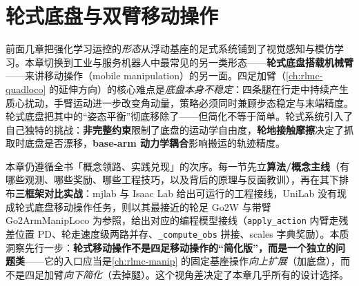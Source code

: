 \chapter{轮式底盘与双臂移动操作}\label{ch:rlmc-wheeled}


前面几章把强化学习运控的\emph{形态}从浮动基座的足式系统铺到了视觉感知与模仿学习。本章切换到工业与服务机器人中最常见的另一类形态——\textbf{轮式底盘搭载机械臂}——来讲移动操作（mobile manipulation）的另一面。四足加臂（\cref{ch:rlmc-quadloco} 的延伸方向）的核心难点是\emph{底盘本身不稳定}：四条腿在行走中持续产生质心扰动，手臂运动进一步改变角动量，策略必须同时兼顾步态稳定与末端精度。轮式底盘把其中的“姿态平衡”彻底移除了——但简化不等于简单。轮式系统引入了自己独特的挑战：\textbf{非完整约束}限制了底盘的运动学自由度，\textbf{轮地接触摩擦}决定了抓取时底盘是否漂移，\textbf{base-arm 动力学耦合}影响搬运的轨迹精度。

本章仍遵循全书「概念领路、实践兑现」的次序。每一节先立\textbf{算法/概念主线}（有哪些观测、哪些奖励、哪些工程技巧，以及背后的原理与反面教训），再在其下排布\textbf{三框架对比实战}：mjlab 与 Isaac Lab 给出可运行的工程接线，UniLab 没有现成轮式底盘移动操作任务，则以其最接近的轮足 Go2W 与带臂 Go2ArmManipLoco 为参照，给出对应的编程模型接线（\verb|apply_action| 内臂走残差位置 PD、轮走速度级两路并存、\verb|_compute_obs| 拼接、scales 字典奖励）。本质洞察先行一步：\textbf{轮式移动操作不是四足移动操作的“简化版”，而是一个独立的问题类}——它的入口应当是\cref{ch:rlmc-manip} 的固定基座操作\emph{向上扩展}（加底盘），而不是四足加臂\emph{向下简化}（去掉腿）。这个视角差决定了本章几乎所有的设计选择。

